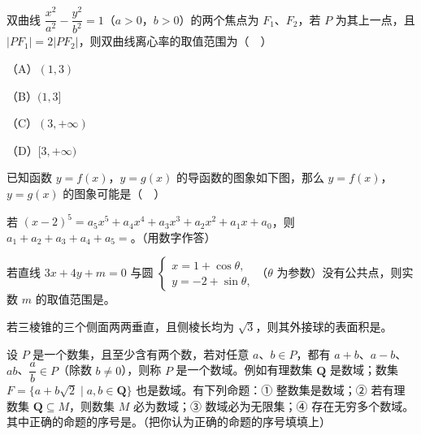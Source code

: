 \begin{question}
双曲线 $\dfrac{x^2}{a^2}-\dfrac{y^2}{b^2}=1$（$a>0$，$b>0$）的两个焦点为 $F_1$、$F_2$，若 $P$ 为其上一点，且 $|PF_1|=2|PF_2|$，则双曲线离心率的取值范围为（　）

（A）$(1,3)$

（B）$(1,3]$

（C）$(3,+\infty)$

（D）$[3,+\infty)$

\Needspace{0.4\textheight}
\end{question}
\begin{question}
已知函数 $y=f(x)$，$y=g(x)$ 的导函数的图象如下图，那么 $y=f(x)$，$y=g(x)$ 的图象可能是（　）
\nopagebreak[4]
\begin{center}\end{center}
\nopagebreak[4]
\end{question}

\begin{question}
若 $(x-2)^5=a_5x^5+a_4x^4+a_3x^3+a_2x^2+a_1x+a_0$，则 $a_1+a_2+a_3+a_4+a_5=$\gkblank{}。（用数字作答）

\end{question}
\begin{question}
若直线 $3x+4y+m=0$ 与圆 $\begin{cases}x=1+\cos\theta,\\ y=-2+\sin\theta,\end{cases}$（$\theta$ 为参数）没有公共点，则实数 $m$ 的取值范围是\gkblank{}。

\end{question}
\begin{question}
若三棱锥的三个侧面两两垂直，且侧棱长均为 $\sqrt3$，则其外接球的表面积是\gkblank{}。

\end{question}
\begin{question}
设 $P$ 是一个数集，且至少含有两个数，若对任意 $a$、$b\in P$，都有 $a+b$、$a-b$、$ab$、$\dfrac ab\in P$（除数 $b\neq0$），则称 $P$ 是一个数域。例如有理数集 $\mathbf Q$ 是数域；数集 $F=\{a+b\sqrt2\mid a,b\in\mathbf Q\}$ 也是数域。有下列命题：① 整数集是数域；② 若有理数集 $\mathbf Q\subseteq M$，则数集 $M$ 必为数域；③ 数域必为无限集；④ 存在无穷多个数域。其中正确的命题的序号是\gkblank{}。（把你认为正确的命题的序号填填上）

\end{question}


